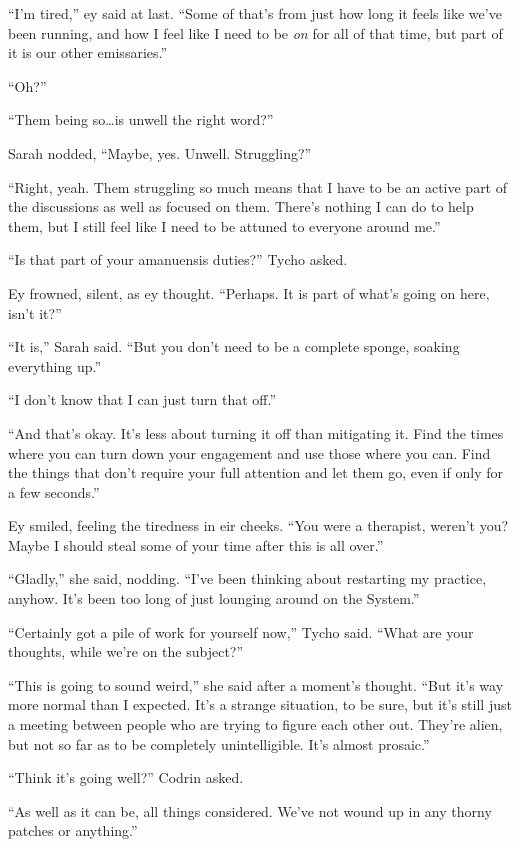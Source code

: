 ``I'm tired,'' ey said at last. ``Some of that's from just how long it feels like we've been running, and how I feel like I need to be \emph{on} for all of that time, but part of it is our other emissaries.''

``Oh?''

``Them being so\ldots is unwell the right word?''

Sarah nodded, ``Maybe, yes. Unwell. Struggling?''

``Right, yeah. Them struggling so much means that I have to be an active part of the discussions as well as focused on them. There's nothing I can do to help them, but I still feel like I need to be attuned to everyone around me.''

``Is that part of your amanuensis duties?'' Tycho asked.

Ey frowned, silent, as ey thought. ``Perhaps. It is part of what's going on here, isn't it?''

``It is,'' Sarah said. ``But you don't need to be a complete sponge, soaking everything up.''

``I don't know that I can just turn that off.''

``And that's okay. It's less about turning it off than mitigating it. Find the times where you can turn down your engagement and use those where you can. Find the things that don't require your full attention and let them go, even if only for a few seconds.''

Ey smiled, feeling the tiredness in eir cheeks. ``You were a therapist, weren't you? Maybe I should steal some of your time after this is all over.''

``Gladly,'' she said, nodding. ``I've been thinking about restarting my practice, anyhow. It's been too long of just lounging around on the System.''

``Certainly got a pile of work for yourself now,'' Tycho said. ``What are your thoughts, while we're on the subject?''

``This is going to sound weird,'' she said after a moment's thought. ``But it's way more normal than I expected. It's a strange situation, to be sure, but it's still just a meeting between people who are trying to figure each other out. They're alien, but not so far as to be completely unintelligible. It's almost prosaic.''

``Think it's going well?'' Codrin asked.

``As well as it can be, all things considered. We've not wound up in any thorny patches or anything.''

